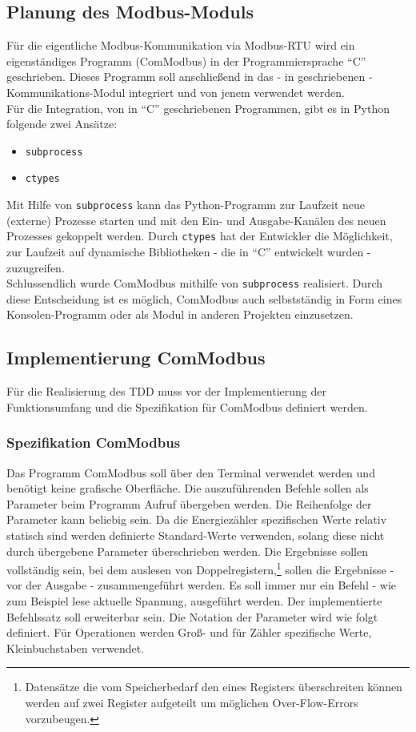 \documentclass[Bachelorarbeit.tex]{subfiles}
\begin{document}
\subsection{Planung des Modbus-Moduls}
\label{sub:plannung_modbus_modul}
Für die eigentliche Modbus-Kommunikation via Modbus-RTU wird ein eigenständiges Programm (ComModbus) in der Programmiersprache "`C"' geschrieben. 
Dieses Programm soll anschließend in das - in  geschriebenen - Kommunikations-Modul integriert und von jenem verwendet werden.
\\
Für die Integration, von in "`C"' geschriebenen Programmen, gibt es in Python folgende zwei Ansätze:
\begin{itemize}
\item \texttt{subprocess}
\item \texttt{ctypes}
\end{itemize}
Mit Hilfe von \texttt{subprocess} kann das Python-Programm zur Laufzeit neue (externe) Prozesse starten und mit den Ein- und Ausgabe-Kanälen des neuen Prozesses gekoppelt werden.
Durch \texttt{ctypes} hat der Entwickler die Möglichkeit, zur Laufzeit auf dynamische Bibliotheken - die in "`C"' entwickelt wurden - zuzugreifen.\\
Schlussendlich wurde ComModbus mithilfe von \texttt{subprocess} realisiert. 
Durch diese Entscheidung ist es möglich, ComModbus auch selbstständig in Form eines Konsolen-Programm oder als Modul in anderen Projekten einzusetzen.

\subsection{Implementierung ComModbus}
Für die Realisierung des \ac{TDD} muss vor der Implementierung der Funktionsumfang und die Spezifikation für ComModbus definiert werden. 

\subsubsection*{Spezifikation ComModbus}
Das Programm ComModbus soll über den Terminal verwendet werden und benötigt keine grafische Oberfläche.
Die auszuführenden Befehle sollen als Parameter beim Programm Aufruf übergeben werden. 
Die Reihenfolge der Parameter kann beliebig sein. 
Da die Energiezähler spezifischen Werte relativ statisch sind werden definierte Standard-Werte verwenden, solang diese nicht durch übergebene Parameter überschrieben werden. 
Die Ergebnisse sollen vollständig sein, bei dem auslesen von Doppelregistern,\footnote{Datensätze die vom Speicherbedarf den eines Registers überschreiten können werden auf zwei Register aufgeteilt um möglichen Over-Flow-Errors vorzubeugen.} sollen die Ergebnisse - vor der Ausgabe - zusammengeführt werden. 
Es soll immer nur ein Befehl - wie zum Beispiel lese aktuelle Spannung, ausgeführt werden. 
Der implementierte Befehlssatz soll erweiterbar sein. 
Die Notation der Parameter wird wie folgt definiert. 
Für Operationen werden Groß- und für Zähler spezifische Werte, Kleinbuchstaben verwendet.
\end{document}
